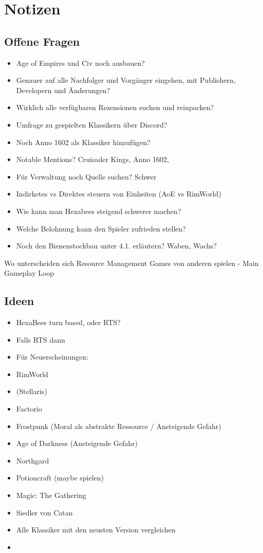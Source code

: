 \section*{Notizen}
\subsection*{Offene Fragen}
\begin{itemize}
    \item Age of Empires und Civ noch ausbauen?
    \item Genauer auf alle Nachfolger und Vorgänger eingehen, mit Publishern, Developern und Änderungen?
    \item Wirklich alle verfügbaren Rezensionen suchen und reinpacken?
    \item Umfrage zu gespielten Klassikern über Discord?
    \item Noch Anno 1602 als Klassiker hinzufügen?
    \item Notable Mentions? Cruisader Kings, Anno 1602, 
    \item Für Verwaltung noch Quelle suchen? Schwer
    \item Indirketes vs Direktes steuern von Einheiten (AoE vs RimWorld)
    \item Wie kann man Hexabees steigend schwerer machen?
    \item Welche Belohnung kann den Spieler zufrieden stellen?
    \item Noch den Bienenstockbau unter 4.1. erläutern? Waben, Wachs?
\end{itemize}

Wo unterscheiden sich Resource Management Games von anderen spielen
- Main Gameplay Loop 

\subsection*{Ideen}
\begin{itemize}

    \item HexaBees turn based, oder RTS?
    \item Falls RTS dann 
    \item Für Neuerscheinungen:
    \item RimWorld
    \item (Stellaris)
    \item Factorio
    \item Frostpunk (Moral als abstrakte Ressource / Ansteigende Gefahr)
    \item Age of Darkness (Ansteigende Gefahr)
    \item Northgard
    \item Potioncraft (maybe spielen)
    \item Magic: The Gathering
    \item Siedler von Catan
    \item Alle Klassiker mit den neusten Version vergleichen
    \item 
\end{itemize}

